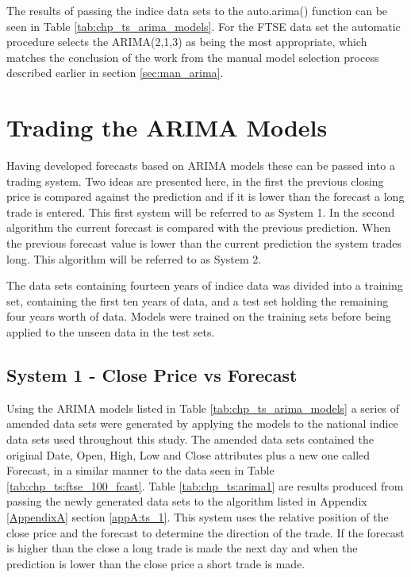 The results of passing the indice data sets to the auto.arima() function can be seen in Table \ref{tab:chp_ts_arima_models}. For the FTSE data set the automatic procedure selects the ARIMA(2,1,3) as being the most appropriate, which matches the conclusion of the work from the manual model selection process described earlier in section \ref{sec:man_arima}.



\section{Trading the ARIMA Models}
\label{sec:traing:arima:models}
Having developed forecasts based on ARIMA models these can be passed into a trading system. Two ideas are presented here, in the first the previous closing price is compared against the prediction and if it is lower than the forecast a long trade is entered. This first system will be referred to as System 1. In the second algorithm the current forecast is compared with the previous prediction. When the previous forecast value is lower than the current prediction the system trades long. This algorithm will be referred to as System 2.

The data sets containing fourteen years of indice data was divided into a training set, containing the first ten years of data, and a test set holding the remaining four years worth of data. Models were trained on the training sets before being applied to the unseen data in the test sets.

\subsection{System 1 - Close Price vs Forecast}
Using the ARIMA models listed in Table \ref{tab:chp_ts_arima_models} a series of amended data sets were generated by applying the models to the national indice data sets used throughout this study. The amended data sets contained the original Date, Open, High, Low and Close attributes plus a new one called Forecast, in a similar manner to the data seen in Table  \ref{tab:chp_ts:ftse_100_fcast}. Table \ref{tab:chp_ts:arima1} are results produced from passing the newly generated data sets to the algorithm listed in Appendix \ref{AppendixA} section \ref{appA:ts_1}. This system uses the relative position of the close price and the forecast to determine the direction of the trade. If the forecast is higher than the close a long trade is made the next day and when the prediction is lower than the close price a short trade is made.

